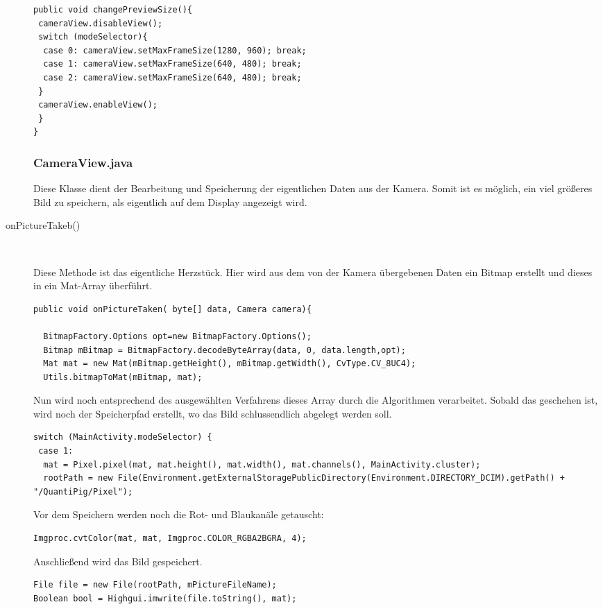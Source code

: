 \begin{description}
\begin{lstlisting}
public void changePreviewSize(){
 cameraView.disableView();
 switch (modeSelector){
  case 0: cameraView.setMaxFrameSize(1280, 960); break;
  case 1: cameraView.setMaxFrameSize(640, 480); break;
  case 2: cameraView.setMaxFrameSize(640, 480); break;
 }
 cameraView.enableView();
 }
}
\end{lstlisting}

\newpage

\subsubsection{CameraView.java}
\label{CameraView}

Diese Klasse dient der Bearbeitung und Speicherung der eigentlichen Daten aus der Kamera. Somit ist es möglich, ein viel größeres Bild zu speichern, als eigentlich auf dem Display angezeigt wird.

\item[onPictureTakeb()]~\par

Diese Methode ist das eigentliche Herzstück. Hier wird aus dem von der Kamera übergebenen Daten ein Bitmap erstellt und dieses in ein Mat-Array überführt.
\begin{lstlisting}
public void onPictureTaken( byte[] data, Camera camera){

  BitmapFactory.Options opt=new BitmapFactory.Options();
  Bitmap mBitmap = BitmapFactory.decodeByteArray(data, 0, data.length,opt);
  Mat mat = new Mat(mBitmap.getHeight(), mBitmap.getWidth(), CvType.CV_8UC4);
  Utils.bitmapToMat(mBitmap, mat);
\end{lstlisting}

Nun wird noch entsprechend des ausgewählten Verfahrens dieses Array durch die Algorithmen verarbeitet.
Sobald das geschehen ist, wird noch der Speicherpfad erstellt, wo das Bild schlussendlich abgelegt werden soll.
\begin{lstlisting}
switch (MainActivity.modeSelector) {
 case 1:
  mat = Pixel.pixel(mat, mat.height(), mat.width(), mat.channels(), MainActivity.cluster);
  rootPath = new File(Environment.getExternalStoragePublicDirectory(Environment.DIRECTORY_DCIM).getPath() + "/QuantiPig/Pixel");
\end{lstlisting}
Vor dem Speichern werden noch die Rot- und Blaukanäle getauscht:
\begin{lstlisting}
Imgproc.cvtColor(mat, mat, Imgproc.COLOR_RGBA2BGRA, 4);
\end{lstlisting}
Anschließend wird das Bild gespeichert.
\begin{lstlisting}
File file = new File(rootPath, mPictureFileName);
Boolean bool = Highgui.imwrite(file.toString(), mat);
\end{lstlisting}



\end{description}
